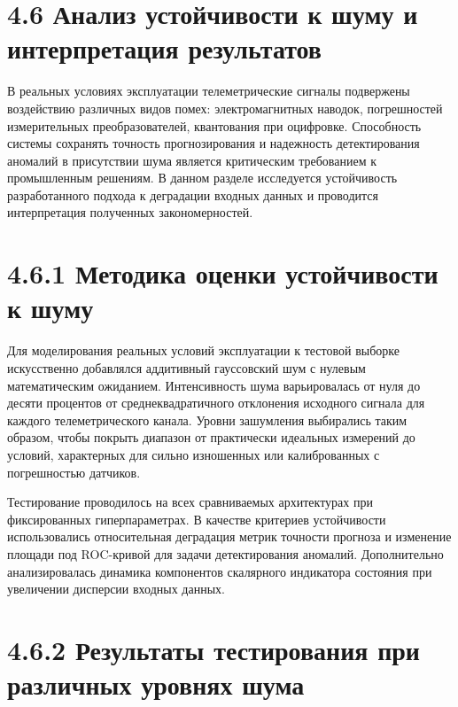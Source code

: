 \documentclass[14pt, a4paper, oneside]{extreport}
\begin{document}
\vspace{1em}
\section{4.6 Анализ устойчивости к шуму и интерпретация результатов}
\vspace{1em}

В реальных условиях эксплуатации телеметрические сигналы подвержены воздействию различных видов помех: электромагнитных наводок, погрешностей измерительных преобразователей, квантования при оцифровке. Способность системы сохранять точность прогнозирования и надежность детектирования аномалий в присутствии шума является критическим требованием к промышленным решениям. В данном разделе исследуется устойчивость разработанного подхода к деградации входных данных и проводится интерпретация полученных закономерностей.

\vspace{1em}
\section{4.6.1 Методика оценки устойчивости к шуму}
\vspace{1em}

Для моделирования реальных условий эксплуатации к тестовой выборке искусственно добавлялся аддитивный гауссовский шум с нулевым математическим ожиданием. Интенсивность шума варьировалась от нуля до десяти процентов от среднеквадратичного отклонения исходного сигнала для каждого телеметрического канала. Уровни зашумления выбирались таким образом, чтобы покрыть диапазон от практически идеальных измерений до условий, характерных для сильно изношенных или калиброванных с погрешностью датчиков.

Тестирование проводилось на всех сравниваемых архитектурах при фиксированных гиперпараметрах. В качестве критериев устойчивости использовались относительная деградация метрик точности прогноза и изменение площади под ROC-кривой для задачи детектирования аномалий. Дополнительно анализировалась динамика компонентов скалярного индикатора состояния при увеличении дисперсии входных данных.

\vspace{1em}
\section{4.6.2 Результаты тестирования при различных уровнях шума}
\vspace{1em}
\end{document}
